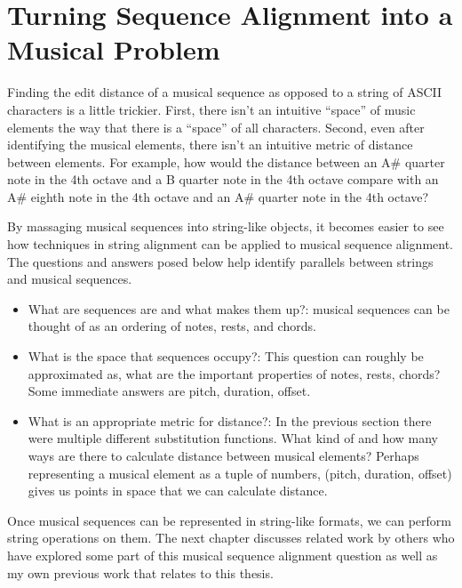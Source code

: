 \section{Turning Sequence Alignment into a Musical Problem}
Finding the edit distance of a musical sequence as opposed to a string of ASCII characters is a little trickier. First, there isn't an intuitive ``space'' of music elements the way that there is a ``space'' of all characters. Second, even after identifying the musical elements, there isn't an intuitive metric of distance between elements. For example, how would the distance between an A\# quarter note in the 4th octave and a B quarter note in the 4th octave compare with an A\# eighth note in the 4th octave and an A\# quarter note in the 4th octave?

By massaging musical sequences into string-like objects, it becomes easier to see how techniques in string alignment can be applied to musical sequence alignment. The questions and answers posed below help identify parallels between strings and musical sequences. 

\begin{itemize}
\item What are sequences are and what makes them up?: musical sequences can be thought of as an ordering of notes, rests, and chords.
\item What is the space that sequences occupy?: This question can roughly be approximated as, what are the important properties of notes, rests, chords? Some immediate answers are pitch, duration, offset.
\item What is an appropriate metric for distance?: In the previous section there were multiple different substitution functions. What kind of and how many ways are there to calculate distance between musical elements? Perhaps representing a musical element as a tuple of numbers, (pitch, duration, offset) gives us points in space that we can calculate distance. 
\end {itemize}

Once musical sequences can be represented in string-like formats, we can perform string operations on them. The next chapter discusses related work by others who have explored some part of this musical sequence alignment question as well as my own previous work that relates to this thesis. 
